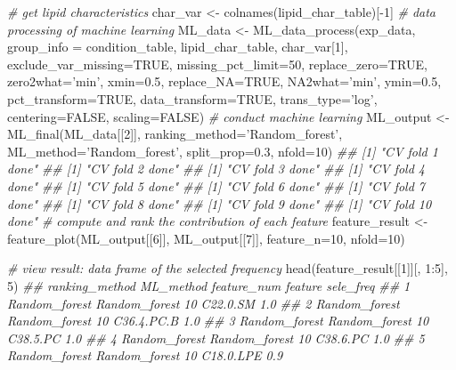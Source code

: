 \documentclass[]{article}
\newcommand{\hlnum}[1]{\textcolor[rgb]{0.816,0.125,0.439}{#1}}%
\newcommand{\hlstr}[1]{\textcolor[rgb]{0.251,0.627,0.251}{#1}}%
\newcommand{\hlcom}[1]{\textcolor[rgb]{0.502,0.502,0.502}{\textit{#1}}}%
\newcommand{\hlopt}[1]{\textcolor[rgb]{0,0,0}{#1}}%
\newcommand{\hlstd}[1]{\textcolor[rgb]{0.251,0.251,0.251}{#1}}%
\newcommand{\hlkwc}[1]{\textcolor[rgb]{0.251,0.251,0.251}{#1}}%
\newcommand{\hlkwd}[1]{\textcolor[rgb]{0.878,0.439,0.125}{#1}}%
\newenvironment{Shaded}{\begin{myshaded}}{\end{myshaded}}
\newcommand{\KeywordTok}[1]{\hlkwd{#1}}
\newcommand{\DataTypeTok}[1]{\hlkwc{#1}}
\newcommand{\DecValTok}[1]{\hlnum{#1}}
\newcommand{\FloatTok}[1]{\hlnum{#1}}
\newcommand{\StringTok}[1]{\hlstr{#1}}
\newcommand{\CommentTok}[1]{\hlcom{#1}}
\newcommand{\OtherTok}[1]{{#1}}
\newcommand{\OperatorTok}[1]{\hlopt{#1}}
\newcommand{\NormalTok}[1]{\hlstd{#1}}
\begin{document}
\begin{Shaded}
\begin{Highlighting}[]
\CommentTok{# get lipid characteristics}
\NormalTok{char_var <-}\StringTok{ }\KeywordTok{colnames}\NormalTok{(lipid_char_table)[}\OperatorTok{-}\DecValTok{1}\NormalTok{]}
\CommentTok{# data processing of machine learning}
\NormalTok{ML_data <-}\StringTok{ }\KeywordTok{ML_data_process}\NormalTok{(exp_data, }\DataTypeTok{group_info =}\NormalTok{ condition_table,}
\NormalTok{                           lipid_char_table, char_var[}\DecValTok{1}\NormalTok{],}
                           \DataTypeTok{exclude_var_missing=}\OtherTok{TRUE}\NormalTok{, }\DataTypeTok{missing_pct_limit=}\DecValTok{50}\NormalTok{,}
                           \DataTypeTok{replace_zero=}\OtherTok{TRUE}\NormalTok{, }\DataTypeTok{zero2what=}\StringTok{'min'}\NormalTok{, }\DataTypeTok{xmin=}\FloatTok{0.5}\NormalTok{,}
                           \DataTypeTok{replace_NA=}\OtherTok{TRUE}\NormalTok{, }\DataTypeTok{NA2what=}\StringTok{'min'}\NormalTok{, }\DataTypeTok{ymin=}\FloatTok{0.5}\NormalTok{,}
                           \DataTypeTok{pct_transform=}\OtherTok{TRUE}\NormalTok{, }\DataTypeTok{data_transform=}\OtherTok{TRUE}\NormalTok{,}
                           \DataTypeTok{trans_type=}\StringTok{'log'}\NormalTok{, }\DataTypeTok{centering=}\OtherTok{FALSE}\NormalTok{, }\DataTypeTok{scaling=}\OtherTok{FALSE}\NormalTok{)}
\CommentTok{# conduct machine learning}
\NormalTok{ML_output <-}\StringTok{ }\KeywordTok{ML_final}\NormalTok{(ML_data[[}\DecValTok{2}\NormalTok{]], }\DataTypeTok{ranking_method=}\StringTok{'Random_forest'}\NormalTok{,}
                      \DataTypeTok{ML_method=}\StringTok{'Random_forest'}\NormalTok{, }\DataTypeTok{split_prop=}\FloatTok{0.3}\NormalTok{, }\DataTypeTok{nfold=}\DecValTok{10}\NormalTok{)}
\CommentTok{## [1] "CV fold 1 done"}
\CommentTok{## [1] "CV fold 2 done"}
\CommentTok{## [1] "CV fold 3 done"}
\CommentTok{## [1] "CV fold 4 done"}
\CommentTok{## [1] "CV fold 5 done"}
\CommentTok{## [1] "CV fold 6 done"}
\CommentTok{## [1] "CV fold 7 done"}
\CommentTok{## [1] "CV fold 8 done"}
\CommentTok{## [1] "CV fold 9 done"}
\CommentTok{## [1] "CV fold 10 done"}
\CommentTok{# compute and rank the contribution of each feature}
\NormalTok{feature_result <-}\StringTok{ }\KeywordTok{feature_plot}\NormalTok{(ML_output[[}\DecValTok{6}\NormalTok{]], ML_output[[}\DecValTok{7}\NormalTok{]],}
                               \DataTypeTok{feature_n=}\DecValTok{10}\NormalTok{, }\DataTypeTok{nfold=}\DecValTok{10}\NormalTok{)}

\CommentTok{# view result: data frame of the selected frequency}
\KeywordTok{head}\NormalTok{(feature_result[[}\DecValTok{1}\NormalTok{]][, }\DecValTok{1}\OperatorTok{:}\DecValTok{5}\NormalTok{], }\DecValTok{5}\NormalTok{)}
\CommentTok{##   ranking_method     ML_method feature_num    feature sele_freq}
\CommentTok{## 1  Random_forest Random_forest          10   C22.0.SM       1.0}
\CommentTok{## 2  Random_forest Random_forest          10 C36.4.PC.B       1.0}
\CommentTok{## 3  Random_forest Random_forest          10   C38.5.PC       1.0}
\CommentTok{## 4  Random_forest Random_forest          10   C38.6.PC       1.0}
\CommentTok{## 5  Random_forest Random_forest          10  C18.0.LPE       0.9}


\end{Highlighting}
\end{Shaded}
\end{document}
